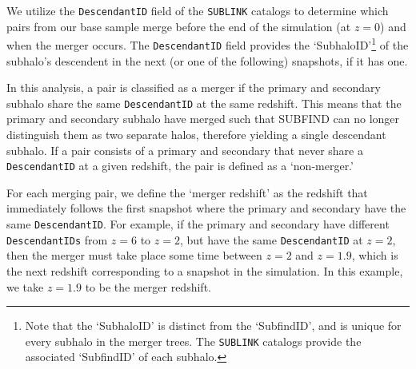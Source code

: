 \documentclass[twocolumn,linenumbers]{aastex631}
\begin{document}
We utilize the \texttt{DescendantID} field of the \texttt{SUBLINK} catalogs to determine which pairs from our base sample merge before the end of the simulation (at $z=0$) and when the merger occurs. 
The \texttt{DescendantID} field provides the `SubhaloID'\footnote{Note that the `SubhaloID' is distinct from the `SubfindID', and is unique for every subhalo in the merger trees. 
The \texttt{SUBLINK} catalogs provide the associated `SubfindID' of each subhalo.} of the subhalo's descendent in the next (or one of the following) snapshots, if it has one. 

In this analysis, a pair is classified as a merger if the primary and secondary subhalo share the same \texttt{DescendantID} at the same redshift. 
This means that the primary and secondary subhalo have merged such that SUBFIND can no longer distinguish them as two separate halos, therefore yielding a single descendant subhalo.
If a pair consists of a primary and secondary that never share a \texttt{DescendantID} at a given redshift, the pair is defined as a `non-merger.'

For each merging pair, we define the `merger redshift' as the redshift that immediately follows the first snapshot where the primary and secondary have the same \texttt{DescendantID}. 
For example, if the primary and secondary have different \texttt{DescendantIDs} from $z=6$ to $z=2$, but have the same \texttt{DescendantID} at $z=2$, then the merger must take place some time between $z=2$ and $z=1.9$, which is the next redshift corresponding to a snapshot in the simulation. 
In this example, we take $z=1.9$ to be the merger redshift. 
\end{document}
